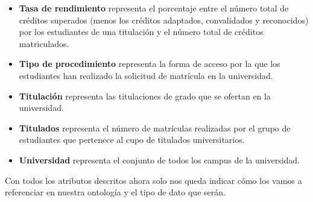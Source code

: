 \begin{itemize}
	\item \textbf{Tasa de rendimiento} representa el porcentaje entre el número total de créditos superados (menos los créditos adaptados, convalidados y reconocidos) por los estudiantes de una titulación y el número total de créditos matriculados.
	\item \textbf{Tipo de procedimiento} representa la forma de acceso por la que los estudiantes han realizado la solicitud de matrícula en la universidad.
	\item \textbf{Titulación} representa las titulaciones de grado que se ofertan en la universidad.
	\item \textbf{Titulados} representa el número de matrículas realizadas por el grupo de estudiantes que pertenece al cupo de titulados universitarios.
	\item \textbf{Universidad} representa el conjunto de todos los campus de la universidad.
\end{itemize}

Con todos los atributos descritos ahora solo nos queda indicar cómo los vamos a referenciar en nuestra ontología y el tipo de dato que serán.

